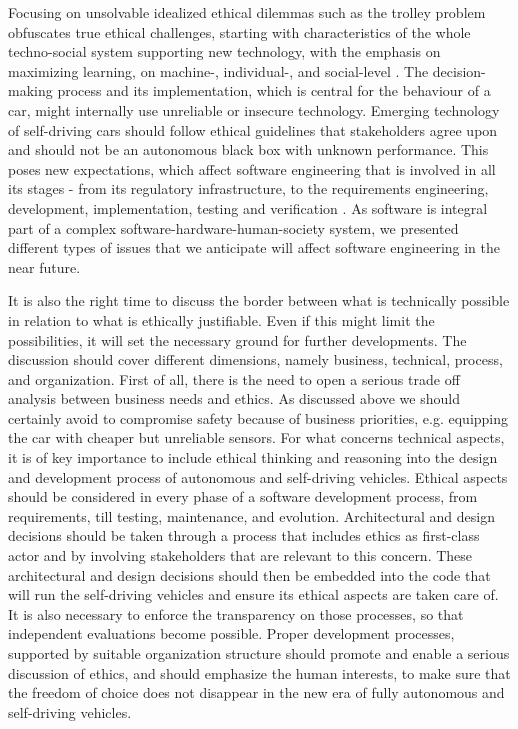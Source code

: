 Focusing on unsolvable idealized ethical dilemmas such as the trolley problem obfuscates true ethical challenges, starting with characteristics of the whole techno-social system supporting new technology, with the emphasis on maximizing learning, on machine-, individual-, and social-level \cite{DodigCrnkovic2012, DBLP:journals/corr/CharisiDFLMSSWY17}. The decision-making process and its implementation, which is central for the behaviour of a car, might internally use unreliable or insecure technology. Emerging technology of self-driving cars should follow ethical guidelines that stakeholders agree upon and should not be an autonomous black box with unknown performance. This poses new expectations, which affect software engineering that is involved in all its stages - from its regulatory infrastructure, to the requirements engineering, development, implementation, testing and verification \cite{Greene2016_1514,MoralMachine2016,Mooney2016,Ackerman2016,DBLP:journals/corr/CharisiDFLMSSWY17}. As software is integral part of a complex software-hardware-human-society system, we presented different types of issues that we anticipate will affect software engineering in the near future.

It is also the right time to discuss the border between what is technically possible in relation to what is ethically justifiable. Even if this might limit the possibilities, it will set the necessary ground for further developments. 
The discussion should cover different dimensions, namely business, technical, process, and organization. First of all, there is the need to open a serious trade off analysis between business needs and ethics. As discussed above we should certainly avoid to compromise safety because of business priorities, e.g. equipping the car with cheaper but unreliable sensors. 
For what concerns technical aspects, it is of key importance to include ethical thinking and reasoning into the design and development process of autonomous and self-driving vehicles. Ethical aspects should be considered in every phase of a software development process, from requirements, till testing, maintenance, and evolution. Architectural and design decisions should be taken through a process that includes ethics as first-class actor and by involving stakeholders that are relevant to this concern. These architectural and design decisions should then be embedded into the code that will run the self-driving vehicles and ensure its ethical aspects are taken care of.    
It is also necessary to enforce the transparency on those processes, so that independent evaluations become possible. Proper development processes, supported by suitable organization structure should promote and enable a serious discussion of ethics, and 
should emphasize the human interests, to make sure that the freedom of choice does not disappear in the new era of fully autonomous and self-driving vehicles. 





			
			
			



